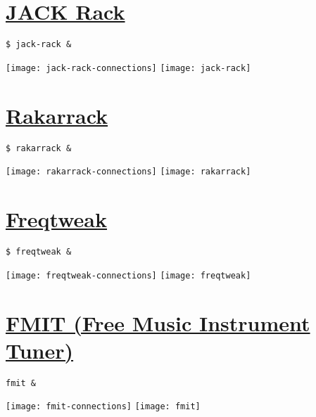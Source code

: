 

\section{\href{http://jack-rack.sourceforge.net}{JACK Rack}}
\begin{verbatim}
$ jack-rack &
\end{verbatim}
\begin{center}
  \texttt{[image: jack-rack-connections]}
  \texttt{[image: jack-rack]}
\end{center}

\section{\href{http://rakarrack.sourceforge.net}{Rakarrack}}
\begin{verbatim}
$ rakarrack &
\end{verbatim}
\begin{center}
  \texttt{[image: rakarrack-connections]}  
  \texttt{[image: rakarrack]}
\end{center}

\section{\href{http://freqtweak.sourceforge.net}{Freqtweak}}
\begin{verbatim}
$ freqtweak &
\end{verbatim}
\begin{center}
  \texttt{[image: freqtweak-connections]}  
  \texttt{[image: freqtweak]}
\end{center}



\section{\href{http://home.gna.org/fmit}{FMIT (Free Music Instrument Tuner)}}
\begin{verbatim}
fmit &
\end{verbatim}
\begin{center}
  \texttt{[image: fmit-connections]}  
  \texttt{[image: fmit]}
\end{center}

